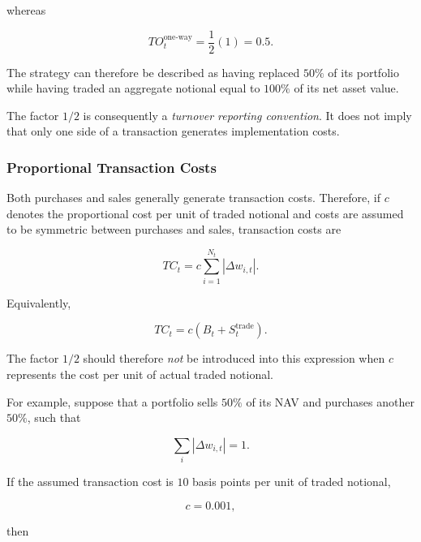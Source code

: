 \documentclass[11pt,a4paper]{article}
\begin{document}
whereas

\begin{equation}
TO_t^{\mathrm{one\text{-}way}}
=
\frac{1}{2}(1)
=
0.5.
\end{equation}

The strategy can therefore be described as having replaced $50\%$ of its
portfolio while having traded an aggregate notional equal to $100\%$ of its
net asset value.

The factor $1/2$ is consequently a \emph{turnover reporting convention}. It
does not imply that only one side of a transaction generates implementation
costs.


\subsubsection{Proportional Transaction Costs}

Both purchases and sales generally generate transaction costs. Therefore, if
$c$ denotes the proportional cost per unit of traded notional and costs are
assumed to be symmetric between purchases and sales, transaction costs are

\begin{equation}
\boxed{
TC_t
=
c
\sum_{i=1}^{N_t}
|\Delta w_{i,t}|.
}
\end{equation}

Equivalently,

\begin{equation}
TC_t
=
c
\left(
B_t+S_t^{\mathrm{trade}}
\right).
\end{equation}

The factor $1/2$ should therefore \emph{not} be introduced into this expression
when $c$ represents the cost per unit of actual traded notional.

For example, suppose that a portfolio sells $50\%$ of its NAV and purchases
another $50\%$, such that

\begin{equation}
\sum_i |\Delta w_{i,t}|=1.
\end{equation}

If the assumed transaction cost is $10$ basis points per unit of traded
notional,

\begin{equation}
c=0.001,
\end{equation}

then
\end{document}
